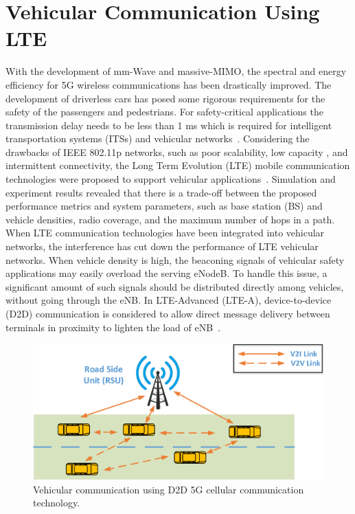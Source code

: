 \section{Vehicular Communication Using LTE}
With the development of mm-Wave and massive-MIMO, the spectral and energy efficiency for 5G wireless communications has been drastically improved. The development of driverless cars has posed some rigorous requirements for the safety of the passengers and pedestrians. For safety-critical applications the transmission delay needs to be less than 1 ms which is required for intelligent transportation systems (ITSs) and vehicular networks~\cite{ge2016vehicular}. Considering the drawbacks of IEEE 802.11p networks, such as poor scalability, low capacity , and intermittent connectivity, the Long Term Evolution (LTE) mobile communication technologies were proposed to support vehicular applications~\cite{araniti2013lte}. Simulation and experiment results revealed that there is a trade-off between the proposed performance metrics and system parameters, such as base station (BS) and vehicle densities, radio coverage, and  the  maximum  number of hops in a path. When LTE communication technologies have been integrated into vehicular networks, the interference has cut down the performance of LTE vehicular networks. When vehicle density is high, the beaconing signals of vehicular safety applications may easily overload the serving eNodeB. To handle this issue, a significant amount of such signals should be distributed directly among vehicles, without  going  through  the  eNB. In  LTE-Advanced (LTE-A), device-to-device (D2D) communication is considered to allow direct message delivery between terminals in proximity to lighten the load of eNB~\cite{mumtaz2014direct}. 

\begin{figure}[!ht]
	\centering
\includegraphics[width=\textwidth,keepaspectratio]{images/Gill/5G/vehiclecomm.eps}
	\caption{Vehicular communication using D2D 5G cellular communication technology.}
	\label{vcomm}
\end{figure}


